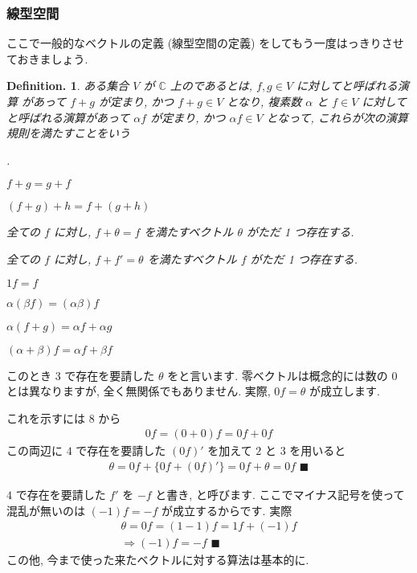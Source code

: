 \documentclass[openany, a4paper, oneside]{book}
\newcounter{enum2}
\renewenvironment{enumerate}{%
\begin{list}%
{%
\arabic{enum2}.\ \,%
}%
{%
\usecounter{enum2}
\setlength{\itemindent}{0pt}%
\setlength{\leftmargin}{6pt}%
\setlength{\rightmargin}{0pt}%
\setlength{\labelsep}{0pt}%
\setlength{\labelwidth}{6pt}%
\setlength{\itemsep}{0pt}%
\setlength{\parsep}{0pt}%
\setlength{\listparindent}{0pt}%
}
}{%
\end{list}%
}
\theoremstyle{break}
\theoremstyle{breakdefn}
\newtheorem{defn}[thm]{Definition.}
\newcommand{\bC}{\mathbb{C}}
\begin{document}
\subsubsection{線型空間}
\label{sec-4-3-2-10-2}

ここで一般的なベクトルの定義 (線型空間の定義) をしてもう一度はっきりさせておきましょう.
\begin{defn}
ある集合 $V$ が $\bC$ 上のであるとは,
$f,g \in V$ に対してと呼ばれる演算
があって $f+g$ が定まり, かつ $f+g \in V$ となり, 複素数 $\alpha$ と $f\in V$ に対して
と呼ばれる演算があって
$\alpha f$ が定まり, かつ $\alpha f \in V$ となって, これらが次の演算規則を満たすことをいう
\begin{enumerate}
\item  $f + g = g + f$
\item  $(f + g ) + h = f + ( g + h )$
\item 全ての $f$ に対し,  $f + \theta = f$ を満たすベクトル $\theta$ がただ 1 つ存在する.
\item 全ての $f$ に対し,  $f + f' = \theta$ を満たすベクトル $f$ がただ 1 つ存在する.
\item  $1f = f$
\item  $\alpha (\beta f) = (\alpha \beta) f$
\item  $\alpha (f + g ) = \alpha f + \alpha g$
\item  $(\alpha + \beta ) f = \alpha f + \beta f$
\end{enumerate}
\end{defn}
このとき 3 で存在を要請した $\theta$ をと言います.
零ベクトルは概念的には数の $0$ とは異なりますが, 全く無関係でもありません. 実際,  $0f=\theta$ が成立します.

これを示すには 8 から
    \begin{align}
        0f= (0+0) f=0f + 0f
    \end{align}
この両辺に $4$ で存在を要請した $(0f)'$ を加えて $2$ と $3$ を用いると
    \begin{align}
        \theta = 0f + \{ 0f + (0f)' \} = 0f + \theta = 0f \,\, \blacksquare
    \end{align}

 $4$ で存在を要請した $f'$ を $-f$ と書き, と呼びます. ここでマイナス記号を使って
混乱が無いのは $(-1) f=-f$ が成立するからです. 実際
    \begin{gather}
        \theta = 0f = (1-1) f = 1f + (-1) f \\
        \Longrightarrow
        (-1) f = -f \,\, \blacksquare
    \end{gather}
この他, 今まで使った来たベクトルに対する算法は基本的に.
\end{document}
